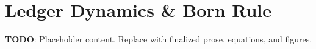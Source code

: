 \section{Ledger Dynamics \& Born Rule}
\label{sec:ledger-dynamics-born-rule}

\textbf{TODO}: Placeholder content. Replace with finalized prose, equations, and figures.

